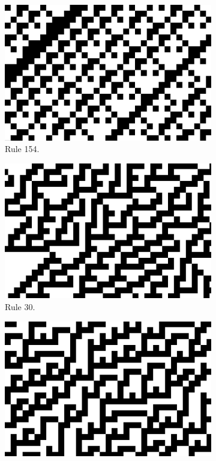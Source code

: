 \documentclass[12pt]{article}
\begin{document}
\begin{figure} [h]
\begin{subfigure}{.5\textwidth}
  \centering
  \includegraphics[width=.9\linewidth]{rule154-zoomed}
  \caption{Rule 154.}
  \label{fig:rule154-zoomed}
 \end{subfigure}%
\begin{subfigure}{.5\textwidth}
  \centering
  \includegraphics[width=.9\linewidth]{rule30-zoomed}
  \caption{Rule 30.}
  \label{fig:rule30-zoomed}
\end{subfigure}
\begin{subfigure}{.5\textwidth}
  \centering
  \includegraphics[width=.9\linewidth]{rule45-zoomed}

\end{subfigure}
\end{figure}
\end{document}
